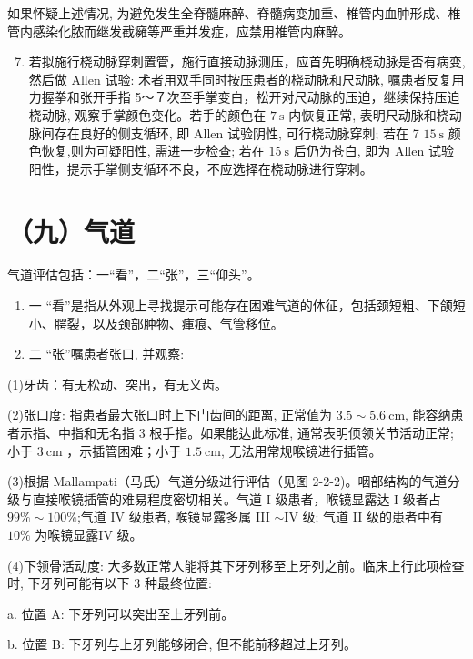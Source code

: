 \documentclass[10pt]{article}
\begin{document}
如果怀疑上述情况, 为避免发生全脊髓麻醉、脊髓病变加重、椎管内血肿形成、椎管内感染化脓而继发截㿈等严重并发症，应禁用椎管内麻醉。

\begin{enumerate}
  \setcounter{enumi}{6}
  \item 若拟施行桡动脉穿刺置管，施行直接动脉测压，应首先明确桡动脉是否有病变, 然后做 Allen 试验: 术者用双手同时按压患者的桡动脉和尺动脉, 嘱患者反复用力握拳和张开手指 5～７次至手掌变白，松开对尺动脉的压迫，继续保持压迫桡动脉, 观察手掌颜色变化。若手的颜色在 $7 \mathrm{~s}$ 内恢复正常, 表明尺动脉和桡动脉间存在良好的侧支循环, 即 Allen 试验阴性, 可行桡动脉穿刺; 若在 7 $15 \mathrm{~s}$ 颜色恢复,则为可疑阳性, 需进一步检查; 若在 $15 \mathrm{~s}$ 后仍为苍白, 即为 Allen 试验阳性，提示手掌侧支循环不良，不应选择在桡动脉进行穿刺。
\end{enumerate}

\section*{（九）气道}
气道评估包括：一“看”，二“张”，三“仰头”。

\begin{enumerate}
  \item 一 “看”是指从外观上寻找提示可能存在困难气道的体征，包括颈短粗、下颌短小、腭裂，以及颈部肿物、㾝痕、气管移位。

  \item 二 “张”嘱患者张口, 并观察:

\end{enumerate}

(1)牙齿：有无松动、突出，有无义齿。

(2)张口度: 指患者最大张口时上下门齿间的距离, 正常值为 $3.5 \sim 5.6 \mathrm{~cm}$, 能容纳患者示指、中指和无名指 3 根手指。如果能达此标准, 通常表明㑔领关节活动正常; 小于 $3 \mathrm{~cm}$ ，示插管困难；小于 $1.5 \mathrm{~cm}$, 无法用常规喉镜进行插管。

(3)根据 Mallampati（马氏）气道分级进行评估（见图 2-2-2)。咽部结构的气道分级与直接喉镜插管的难易程度密切相关。气道 I 级患者，喉镜显露达 I 级者占 $99 \% \sim 100 \%$;气道 IV 级患者, 喉镜显露多属 III $\sim \mathrm{IV}$ 级; 气道 II 级的患者中有 $10 \%$ 为喉镜显露IV 级。

(4)下领骨活动度: 大多数正常人能将其下牙列移至上牙列之前。临床上行此项检查时, 下牙列可能有以下 3 种最终位置:

a. 位置 A: 下牙列可以突出至上牙列前。

b. 位置 B: 下牙列与上牙列能够闭合, 但不能前移超过上牙列。
\end{document}
